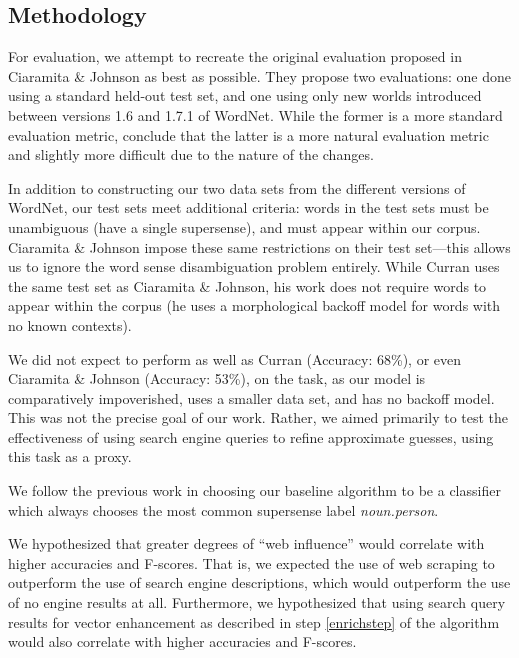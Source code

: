 \documentclass{article}
\begin{document}
\subsection{Methodology}


For evaluation, we attempt to recreate the original evaluation proposed in Ciaramita \& Johnson \cite{cj} as best as possible. 
They propose two evaluations: one done using a standard held-out test set, and one using only new worlds introduced between versions 1.6 and 1.7.1 of WordNet. 
While the former is a more standard evaluation metric, \cite{cj} conclude that the latter is a more natural evaluation metric and slightly more difficult due to the nature of the changes.

In addition to constructing our two data sets from the different versions of WordNet, our test sets meet additional criteria: words in the test sets must be unambiguous (have a single supersense), and must appear within our corpus. 
Ciaramita \& Johnson \cite{cj} impose these same restrictions on their test set---this allows us to ignore the word sense disambiguation problem entirely.
While Curran \cite{curran} uses the same test set as Ciaramita \& Johnson, his work does not require words to appear within the corpus (he uses a morphological backoff model for words with no known contexts).

We did not expect to perform as well as Curran \cite{curran} (Accuracy: 68\%), or even Ciaramita \& Johnson \cite{cj} (Accuracy: 53\%), on the task, as our model is comparatively impoverished, uses a smaller data set, and has no backoff model. 
This was not the precise goal of our work. 
Rather, we aimed primarily to test the effectiveness of using search engine queries to refine approximate guesses, using this task as a proxy.

We follow the previous work in choosing our baseline algorithm to be a classifier which always chooses the most common supersense label {\it noun.person}.

We hypothesized that greater degrees of ``web influence'' would correlate with higher accuracies and F-scores. 
That is, we expected the use of web scraping to outperform the use of search engine descriptions, which would outperform the use of no engine results at all.
Furthermore, we hypothesized that using search query results for vector enhancement as described in step \ref{enrichstep} of the algorithm would also correlate with higher accuracies and F-scores.
\end{document}
